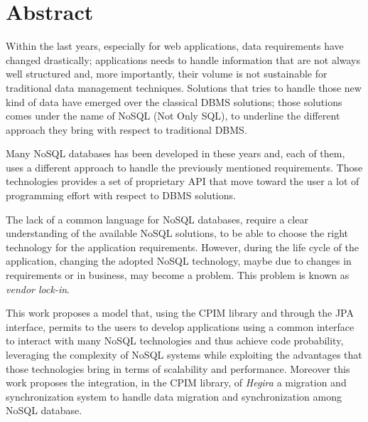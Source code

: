 \cleardoublepage

\thispagestyle{empty}

\chapter*{Abstract}
Within the last years, especially for web applications, data requirements have changed drastically; applications needs to handle information that are not always well structured and, more importantly, their volume is not sustainable for traditional data management techniques. Solutions that tries to handle those new kind of data have emerged over the classical DBMS solutions; those solutions comes under the name of NoSQL (Not Only SQL), to underline the different approach they bring with respect to traditional  DBMS.

\noindent Many NoSQL databases has been developed in these years and, each of them, uses a different approach to handle the previously mentioned requirements. Those technologies provides a set of proprietary API that move toward the user a lot of programming effort with respect to DBMS solutions. 

\noindent The lack of a common language for NoSQL databases, require a clear understanding of the available NoSQL solutions, to be able to choose the right technology for the application requirements. However, during the life cycle of the application, changing the adopted NoSQL technology, maybe due to changes in requirements or in business, may become a problem. This problem is known as \textit{vendor lock-in}.    

\noindent This work proposes a model that, using the CPIM library and through the JPA interface, permits to the users to develop applications using a common interface to interact with many NoSQL technologies and thus achieve code probability, leveraging the complexity of NoSQL systems while exploiting the advantages that those technologies bring in terms of scalability and performance. Moreover this work proposes the integration, in the CPIM library, of \textit{Hegira} a migration and synchronization system to handle data migration and synchronization among NoSQL database.

\cleardoublepage